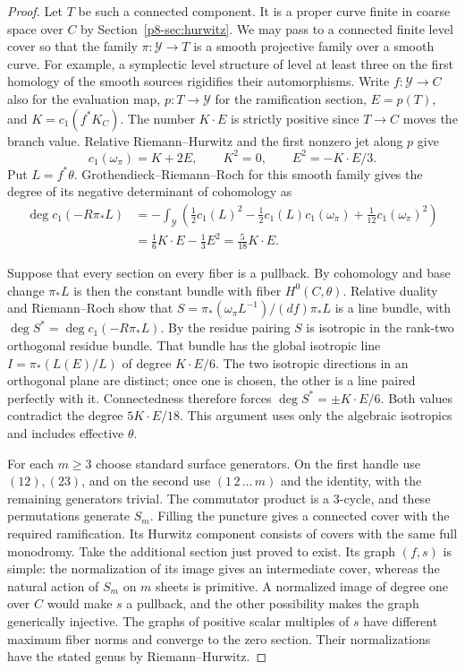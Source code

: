 \begin{proof}
Let $T$ be such a connected component. It is a proper curve finite
in coarse space over $C$ by Section~\ref{p8-sec:hurwitz}. We may pass
to a connected finite level cover so that the family
$\pi:\mathcal Y\to T$ is a smooth projective family over a smooth
curve. For example, a symplectic level structure of level at least
three on the first homology of the smooth sources rigidifies their
automorphisms. Write $f:\mathcal Y\to C$ also for the evaluation map,
$p:T\to\mathcal Y$ for the ramification section, $E=p(T)$, and
$K=c_1(f^*K_C)$. The number $K\cdot E$ is strictly positive since
$T\to C$ moves the branch value. Relative Riemann--Hurwitz and the
first nonzero jet along $p$ give
\[
 c_1(\omega_\pi)=K+2E,\qquad K^2=0,\qquad E^2=-K\cdot E/3.
\]
Put $L=f^*\theta$. Grothendieck--Riemann--Roch for this smooth family
gives the degree of its negative determinant of cohomology as
\begin{align*}
 \deg c_1(-R\pi_*L)
 &=-\int_{\mathcal Y}
    \left(\tfrac12c_1(L)^2
       -\tfrac12 c_1(L)c_1(\omega_\pi)
       +\tfrac1{12}c_1(\omega_\pi)^2\right)\\
 &=\tfrac16 K\cdot E-\tfrac13 E^2=\tfrac5{18}K\cdot E .
\end{align*}

Suppose that every section on every fiber is a pullback. By cohomology
and base change $\pi_*L$ is then the constant bundle with fiber
$H^0(C,\theta)$. Relative duality and Riemann--Roch show that
$S=\pi_*(\omega_\pi L^{-1})/(df)\pi_* L$ is a line bundle, with
$\deg S^*=\deg c_1(-R\pi_*L)$. By the residue pairing $S$ is
isotropic in the rank-two orthogonal residue bundle. That bundle has
the global isotropic line $I=\pi_*(L(E)/L)$ of degree $K\cdot E/6$.
The two isotropic directions in an orthogonal plane are distinct; once
one is chosen, the other is a line paired perfectly with it.
Connectedness therefore forces $\deg S^*=\pm K\cdot E/6$.
Both values contradict the degree $5K\cdot E/18$. This argument
uses only the algebraic isotropics and includes effective $\theta$.

For each $m\ge3$ choose standard surface generators. On the first
handle use $(12),(23)$, and on the second use $(1\,2\,\ldots\,m)$
and the identity, with the remaining generators trivial. The
commutator product is a $3$-cycle, and these permutations generate
$S_m$. Filling the puncture gives a connected cover with the required
ramification. Its Hurwitz component consists of covers with the same
full monodromy. Take the additional section just proved to exist.
Its graph $(f,s)$ is simple: the normalization of its image gives an
intermediate cover, whereas the natural action of $S_m$ on $m$
sheets is primitive. A normalized image of degree one over $C$
would make $s$ a pullback, and the other possibility makes the graph
generically injective. The graphs of positive scalar multiples of
$s$ have different maximum fiber norms and converge to the zero
section. Their normalizations have the stated genus by
Riemann--Hurwitz.
\end{proof}

